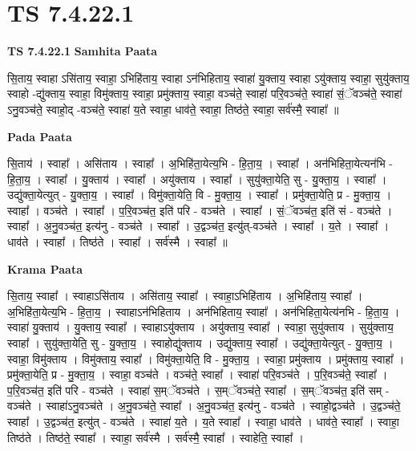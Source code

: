 \documentclass[17pt]{extarticle}
\begin{document}
\section{ TS 7.4.22.1 }

\textbf{TS 7.4.22.1 } \newline
\textbf{Samhita Paata} \newline

सि॒ताय॒ स्वाहा ऽसि॑ताय॒ स्वाहा॒ ऽभिहि॑ताय॒ स्वाहा ऽन॑भिहिताय॒ स्वाहा॑ यु॒क्ताय॒ स्वाहा ऽयु॑क्ताय॒ स्वाहा॒ सुयु॑क्ताय॒ स्वाहो -द्यु॑क्ताय॒ स्वाहा॒ विमु॑क्ताय॒ स्वाहा॒ प्रमु॑क्ताय॒ स्वाहा॒ वञ्च॑ते॒ स्वाहा॑ परि॒वञ्च॑ते॒ स्वाहा॑ सं॒ॅवञ्च॑ते॒ स्वाहा॑ ऽनु॒वञ्च॑ते॒ स्वाहो॒द् -वञ्च॑ते॒ स्वाहा॑ य॒ते स्वाहा॒ धाव॑ते॒ स्वाहा॒ तिष्ठ॑ते॒ स्वाहा॒ सर्व॑स्मै॒ स्वाहा᳚ ॥ \newline

\textbf{Pada Paata} \newline

सि॒ताय॑ । स्वाहा᳚ । असि॑ताय । स्वाहा᳚ । अ॒भिहि॑ता॒येत्य॒भि - हि॒ता॒य॒ । स्वाहा᳚ । अन॑भिहिता॒येत्यन॑भि - हि॒ता॒य॒ । स्वाहा᳚ । यु॒क्ताय॑ । स्वाहा᳚ । अयु॑क्ताय । स्वाहा᳚ । सुयु॑क्ता॒येति॒ सु - यु॒क्ता॒य॒ । स्वाहा᳚ । उद्यु॑क्ता॒येत्युत् - यु॒क्ता॒य॒ । स्वाहा᳚ । विमु॑क्ता॒येति॒ वि - मु॒क्ता॒य॒ । स्वाहा᳚ । प्रमु॑क्ता॒येति॒ प्र - मु॒क्ता॒य॒ । स्वाहा᳚ । वञ्च॑ते । स्वाहा᳚ । प॒रि॒वञ्च॑त॒ इति॑ परि - वञ्च॑ते । स्वाहा᳚ । सं॒ॅवञ्च॑त॒ इति॑ सं - वञ्च॑ते । स्वाहा᳚ । अ॒नु॒वञ्च॑त॒ इत्य॑नु - वञ्च॑ते । स्वाहा᳚ । उ॒द्वञ्च॑त॒ इत्यु॑त्-वञ्च॑ते । स्वाहा᳚ । य॒ते । स्वाहा᳚ । धाव॑ते । स्वाहा᳚ । तिष्ठ॑ते । स्वाहा᳚ । सर्व॑स्मै । स्वाहा᳚ ॥  \newline


\textbf{Krama Paata} \newline

सि॒ताय॒ स्वाहा᳚ । स्वाहाऽसि॑ताय । असि॑ताय॒ स्वाहा᳚ । स्वाहा॒ऽभिहि॑ताय । अ॒भिहि॑ताय॒ स्वाहा᳚ । अ॒भिहि॑ता॒येत्य॒भि - हि॒ता॒य॒ । स्वाहाऽन॑भिहिताय । अन॑भिहिताय॒ स्वाहा᳚ । अन॑भिहिता॒येत्य॑नभि - हि॒ता॒य॒ । स्वाहा॑ यु॒क्ताय॑ । यु॒क्ताय॒ स्वाहा᳚ । स्वाहाऽयु॑क्ताय । अयु॑क्ताय॒ स्वाहा᳚ । स्वाहा॒ सुयु॑क्ताय । सुयु॑क्ताय॒ स्वाहा᳚ । सुयु॑क्ता॒येति॒ सु - यु॒क्ता॒य॒ । स्वाहोद्यु॑क्ताय । उद्यु॑क्ताय॒ स्वाहा᳚ । उद्यु॑क्ता॒येत्युत् - यु॒क्ता॒य॒ । स्वाहा॒ विमु॑क्ताय । विमु॑क्ताय॒ स्वाहा᳚ । विमु॑क्ता॒येति॒ वि - मु॒क्ता॒य॒ । स्वाहा॒ प्रमु॑क्ताय । प्रमु॑क्ताय॒ स्वाहा᳚ । प्रमु॑क्ता॒येति॒ प्र - मु॒क्ता॒य॒ । स्वाहा॒ वञ्च॑ते । वञ्च॑ते॒ स्वाहा᳚ । स्वाहा॑ परि॒वञ्च॑ते । प॒रि॒वञ्च॑ते॒ स्वाहा᳚ । प॒रि॒वञ्च॑त॒ इति॑ परि - वञ्च॑ते । स्वाहा॑ स॒म्ॅवञ्च॑ते । स॒म्ॅवञ्च॑ते॒ स्वाहा᳚ । स॒म्ॅवञ्च॑त॒ इति॑ सम् - वञ्च॑ते । स्वाहा॑ऽनु॒वञ्च॑ते । अ॒नु॒वञ्च॑ते॒ स्वाहा᳚ । अ॒नु॒वञ्च॑त॒ इत्य॑नु - वञ्च॑ते । स्वाहो॒द्वञ्च॑ते । उ॒द्वञ्च॑ते॒ स्वाहा᳚ । उ॒द्वञ्च॑त॒ इत्यु॑त् - वञ्च॑ते । स्वाहा॑ य॒ते । य॒ते स्वाहा᳚ । स्वाहा॒ धाव॑ते । धाव॑ते॒ स्वाहा᳚ । स्वाहा॒ तिष्ठ॑ते । तिष्ठ॑ते॒ स्वाहा᳚ । स्वाहा॒ सर्व॑स्मै । सर्व॑स्मै॒ स्वाहा᳚ । स्वाहेति॒ स्वाहा᳚ । \newline
\end{document}
